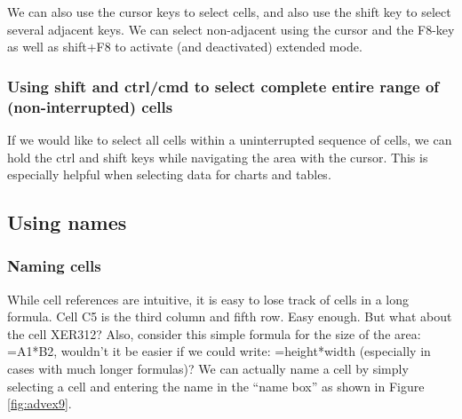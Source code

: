 \documentclass[]{book}
\begin{document}
We can also use the cursor keys to select cells, and also use the shift key to select several adjacent keys. We can select non-adjacent using the cursor and the F8-key as well as shift+F8 to activate (and deactivated) extended mode.

\hypertarget{using-shift-and-ctrlcmd-to-select-complete-entire-range-of-non-interrupted-cells}{%
\subsubsection*{Using shift and ctrl/cmd to select complete entire range of (non-interrupted) cells}\label{using-shift-and-ctrlcmd-to-select-complete-entire-range-of-non-interrupted-cells}}

If we would like to select all cells within a uninterrupted sequence of cells, we can hold the ctrl and shift keys while navigating the area with the cursor. This is especially helpful when selecting data for charts and tables.

\hypertarget{using-names}{%
\subsection{Using names}\label{using-names}}

\hypertarget{naming-cells}{%
\subsubsection*{Naming cells}\label{naming-cells}}

While cell references are intuitive, it is easy to lose track of cells in a long formula. Cell C5 is the third column and fifth row. Easy enough. But what about the cell XER312? Also, consider this simple formula for the size of the area: =A1*B2, wouldn't it be easier if we could write: =height*width (especially in cases with much longer formulas)? We can actually name a cell by simply selecting a cell and entering the name in the ``name box'' as shown in Figure \ref{fig:advex9}.
\end{document}
